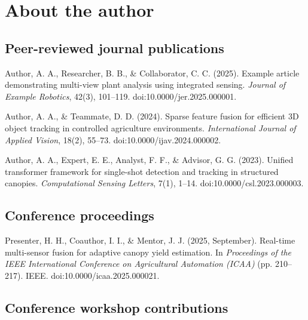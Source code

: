 \chapter{About the author}
\lipsum[1-2]

\section*{Peer-reviewed journal publications}

Author, A. A., Researcher, B. B., \& Collaborator, C. C. (2025). Example article demonstrating multi-view plant analysis using integrated sensing. \textit{Journal of Example Robotics}, 42(3), 101–119. doi:10.0000/jer.2025.000001.

Author, A. A., \& Teammate, D. D. (2024). Sparse feature fusion for efficient 3D object tracking in controlled agriculture environments. \textit{International Journal of Applied Vision}, 18(2), 55–73. doi:10.0000/ijav.2024.000002.

Author, A. A., Expert, E. E., Analyst, F. F., \& Advisor, G. G. (2023). Unified transformer framework for single-shot detection and tracking in structured canopies. \textit{Computational Sensing Letters}, 7(1), 1–14. doi:10.0000/csl.2023.000003.

\section*{Conference proceedings}

Presenter, H. H., Coauthor, I. I., \& Mentor, J. J. (2025, September). Real-time multi-sensor fusion for adaptive canopy yield estimation. In \textit{Proceedings of the IEEE International Conference on Agricultural Automation (ICAA)} (pp. 210–217). IEEE. doi:10.0000/icaa.2025.000021.

\section*{Conference workshop contributions}

